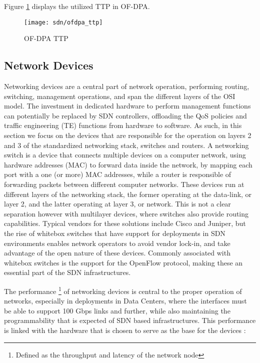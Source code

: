 \begin {enumerate}
\par Figure \ref{fig:ofdpa_tables} displays the utilized TTP in OF-DPA.

\begin{figure}[H]
    \centering
    \texttt{[image: sdn/ofdpa\_ttp]}
    \caption{OF-DPA TTP \cite{broadcom_corporation_openflow_2017}}
    \label{fig:ofdpa_tables}
\end{figure}

\subsection {Network Devices}

Networking devices are a central part of network operation, performing routing, switching, management operations, and span the different layers of the OSI model. 
The investment in dedicated hardware to perform management functions can potentially be replaced by SDN controllers, offloading the QoS policies and traffic
engineering (TE) functions from hardware to software. As such, in this section we focus on the devices that are responsible for the operation on layers 2 and 3 of
the standardized networking stack, switches and routers. A networking switch is a device that connects multiple devices on a computer network, using hardware
addresses (MAC) to forward data inside the network, by mapping each port with a one (or more) MAC addresses, while a router is responsible of forwarding packets 
between different computer networks. These devices run at different layers of the networking stack, the former operating at the data-link, or layer 2, and the latter
operating at layer 3, or network. This is not a clear separation however with multilayer devices, where switches also provide routing capabilities. Typical vendors
for these solutions include Cisco and Juniper, but the rise of whitebox switches that have support for deployments in SDN environments enables network operators to
avoid vendor lock-in, and take advantage of the open nature of these devices. Commonly associated with whitebox switches is the support for the OpenFlow protocol,
making these an essential part of the SDN infrastructures.

\par The performance \footnote {Defined as the throughput and latency of the network node} of networking devices is central to the proper operation of networks,
especially in deployments in Data Centers, where the interfaces must be able to support 100 Gbps links and further, while also maintaining the programmability that
is expected of SDN based infrastructures. This performance is linked with the hardware that is chosen to serve as the base for the devices \cite{sezer_are_2013}:


\end{enumerate}

